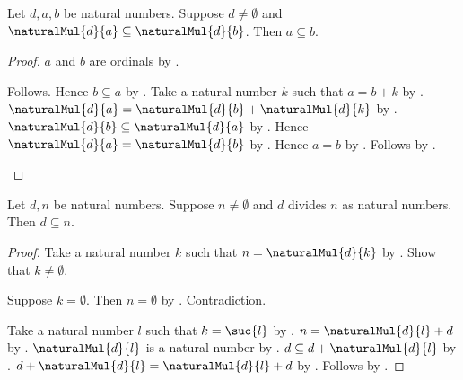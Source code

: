 \begin{theorem}\label{spike15_positive_multiplication_reflects_order}
    Let $d,a,b$ be natural numbers.
    Suppose $d\neq\emptyset$ and
        $\naturalMul{d}{a}\subseteq\naturalMul{d}{b}$.
    Then $a\subseteq b$.
\end{theorem}
\begin{proof}
    $a$ and $b$ are ordinals by .
    \begin{byCase}
            Follows.
            Hence $b\subseteq a$
                by .
            Take a natural number $k$ such that $a=b+k$
                by .
            $\naturalMul{d}{a}
                =\naturalMul{d}{b}+\naturalMul{d}{k}$
                by .
            $\naturalMul{d}{b}\subseteq\naturalMul{d}{a}$
                by .
            Hence $\naturalMul{d}{a}=\naturalMul{d}{b}$
                by .
            Hence $a=b$
                by .
            Follows by \auto.
    \end{byCase}
\end{proof}

\begin{proposition}\label{spike15_divisor_bounded_by_nonzero_dividend}
    Let $d,n$ be natural numbers.
    Suppose $n\neq\emptyset$ and
        $d$ divides $n$ as natural numbers.
    Then $d\subseteq n$.
\end{proposition}
\begin{proof}
    Take a natural number $k$ such that $n=\naturalMul{d}{k}$
        by .
    Show that $k\neq\emptyset$.
    \begin{subproof}
        Suppose $k=\emptyset$.
        Then $n=\emptyset$
            by .
        Contradiction.
    \end{subproof}
    Take a natural number $l$ such that $k=\suc{l}$
        by .
    $n=\naturalMul{d}{l}+d$
        by .
    $\naturalMul{d}{l}$ is a natural number
        by .
    $d\subseteq d+\naturalMul{d}{l}$
        by .
    $d+\naturalMul{d}{l}=\naturalMul{d}{l}+d$
        by .
    Follows by \auto.
\end{proof}

